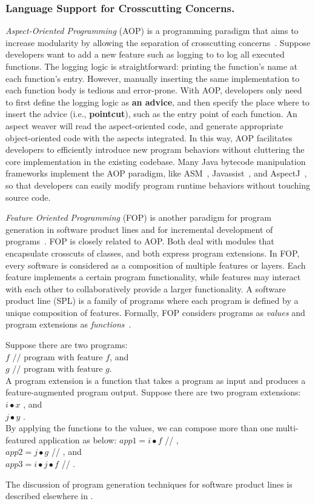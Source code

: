 \subsubsection{Language Support for Crosscutting Concerns.}
{\it Aspect-Oriented Programming} (AOP) is a programming paradigm that aims to increase modularity by allowing the separation of crosscutting concerns~\cite{aspectj}. Suppose developers want to add a new feature such as logging to to log all executed functions. The logging logic is straightforward: printing the function's name at each function's entry. However, manually inserting the same implementation to each function body is tedious and error-prone. With AOP, developers only need to first define the logging logic as \textbf{an advice}, and then specify the place where to insert the advice (i.e., \textbf{pointcut}), such as the entry point of each function. An aspect weaver will read the aspect-oriented code, and generate appropriate object-oriented code with the aspects integrated. In this way, AOP facilitates developers to efficiently introduce new program behaviors without cluttering the core implementation in the existing codebase. Many Java bytecode manipulation frameworks implement the AOP paradigm, like ASM~\cite{asm}, Javassist~\cite{javassist}, and AspectJ~\cite{aspectj}, so that developers can easily modify program runtime behaviors without touching source code. 

{\it Feature Oriented Programming} (FOP) is another paradigm for program generation in software product lines and for incremental development of programs~\cite{Batory1992:DIH}. FOP is closely related to AOP. Both deal with modules that encapsulate crosscuts of classes, and both express program extensions. In FOP, every software is considered as a composition of multiple features or layers. Each feature implements a certain program functionality, while features may interact with each other to collaboratively provide a larger functionality. A software product line (SPL) is a family of programs where each program is defined by a unique composition of features. Formally, FOP considers programs as \emph{values} and program extensions as \emph{functions}~\cite{Lammel2013:fop}. 

\noindent Suppose there are two programs: \\
$f\text{	// program with feature }f$, and\\
$g\text{	// program with feature }g$.\\
A program extension is a function that takes a program as input and produces a feature-augmented program output. Suppose there are two program extensions:\\
$i \bullet x$ , and \\
$j \bullet y$ .\\
By applying the functions to the values, we can compose more than one multi-featured application as below:
$app1 = i \bullet f$ // ,\\
$app2 = j \bullet g$ // , and\\ 
$app3 = i \bullet j \bullet f$ // .
 
The discussion of program generation techniques for software product lines is described elsewhere in . 

